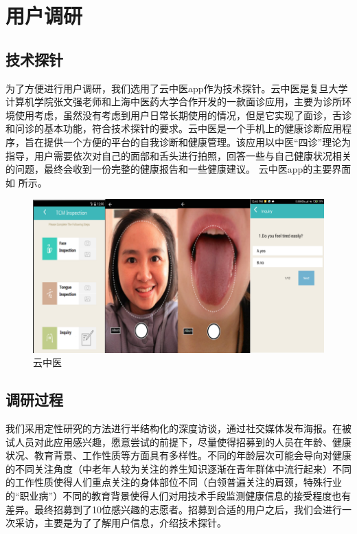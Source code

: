 \chapter{用户调研}

\section{技术探针}
为了方便进行用户调研，我们选用了云中医app作为技术探针。云中医是复旦大学计算机学院张文强老师和上海中医药大学合作开发的一款面诊应用，主要为诊所环境使用考虑，虽然没有考虑到用户日常长期使用的情况，但是它实现了面诊，舌诊和问诊的基本功能，符合技术探针的要求。云中医是一个手机上的健康诊断应用程序，旨在提供一个方便的平台的自我诊断和健康管理。该应用以中医“四诊”理论为指导，用户需要依次对自己的面部和舌头进行拍照，回答一些与自己健康状况相关的问题，最终会收到一份完整的健康报告和一些健康建议。
云中医app的主要界面如 所示。

\begin{figure}
    \centering
    \includegraphics{images/main.png}
    \caption{云中医}
    \label{fig:main}
\end{figure}

\section{调研过程}
 
我们采用定性研究的方法进行半结构化的深度访谈，通过社交媒体发布海报。在被试人员对此应用感兴趣，愿意尝试的前提下，尽量使得招募到的人员在年龄、健康状况、教育背景、工作性质等方面具有多样性。不同的年龄层次可能会导向对健康的不同关注角度（中老年人较为关注的养生知识逐渐在青年群体中流行起来）不同的工作性质使得人们重点关注的身体部位不同（白领普遍关注的肩颈，特殊行业的“职业病”）不同的教育背景使得人们对用技术手段监测健康信息的接受程度也有差异。最终招募到了10位感兴趣的志愿者。招募到合适的用户之后，我们会进行一次采访，主要是为了了解用户信息，介绍技术探针。

